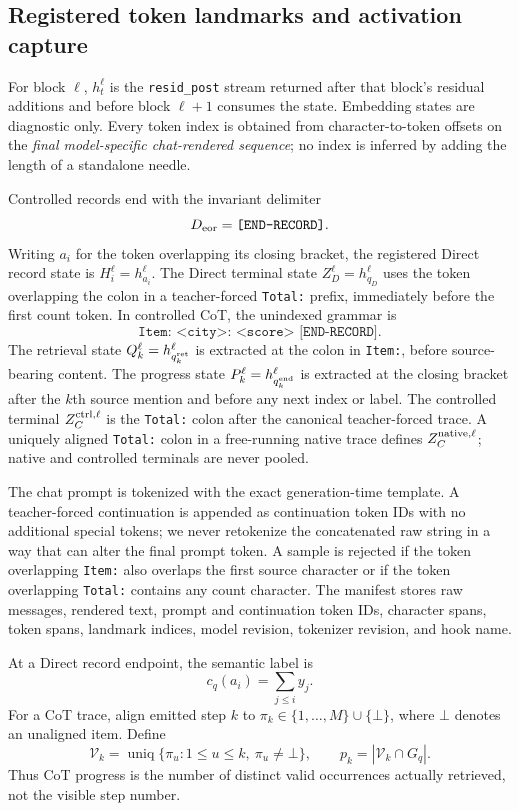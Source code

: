 \subsection{Registered token landmarks and activation capture}

For block \(\ell\), \(h_t^\ell\) is the \texttt{resid\_post} stream returned
after that block's residual additions and before block \(\ell+1\) consumes the
state. Embedding states are diagnostic only. Every token index is obtained
from character-to-token offsets on the \emph{final model-specific
chat-rendered sequence}; no index is inferred by adding the length of a
standalone needle.

Controlled records end with the invariant delimiter
\[
  D_{\rm eor}=\texttt{[END-RECORD]}.
\]
Writing \(a_i\) for the token overlapping its closing bracket, the registered
Direct record state is \(H_i^\ell=h_{a_i}^\ell\). The Direct terminal state
\(Z_D^\ell=h_{q_D}^\ell\) uses the token overlapping the colon in a
teacher-forced \texttt{Total:} prefix, immediately before the first count
token. In controlled CoT, the unindexed grammar is
\[
  \texttt{Item: <city>: <score> [END-RECORD]}.
\]
The retrieval state \(Q_k^\ell=h_{q_k^{\rm ret}}^\ell\) is extracted at the
colon in \texttt{Item:}, before source-bearing content. The progress state
\(P_k^\ell=h_{q_k^{\rm end}}^\ell\) is extracted at the closing bracket after
the \(k\)th source mention and before any next index or label. The controlled
terminal \(Z_C^{\rm ctrl,\ell}\) is the \texttt{Total:} colon after the
canonical teacher-forced trace. A uniquely aligned \texttt{Total:} colon in a
free-running native trace defines \(Z_C^{\rm native,\ell}\); native and
controlled terminals are never pooled.

The chat prompt is tokenized with the exact generation-time template. A
teacher-forced continuation is appended as continuation token IDs with no
additional special tokens; we never retokenize the concatenated raw string in
a way that can alter the final prompt token. A sample is rejected if the token
overlapping \texttt{Item:} also overlaps the first source character or if the
token overlapping \texttt{Total:} contains any count character. The manifest
stores raw messages, rendered text, prompt and continuation token IDs,
character spans, token spans, landmark indices, model revision, tokenizer
revision, and hook name.

At a Direct record endpoint, the semantic label is
\begin{equation}
  c_q(a_i)=\sum_{j\leq i}y_j.
\label{eq:prefix-count}
\end{equation}
For a CoT trace, align emitted step \(k\) to
\(\pi_k\in\{1,\ldots,M\}\cup\{\bot\}\), where \(\bot\) denotes an unaligned
item. Define
\begin{equation}
  \mathcal V_k=\operatorname{uniq}
  \{\pi_u:1\leq u\leq k,\ \pi_u\neq\bot\},
  \qquad
  p_k=|\mathcal V_k\cap G_q|.
\label{eq:semantic-progress}
\end{equation}
Thus CoT progress is the number of distinct valid occurrences actually
retrieved, not the visible step number.

